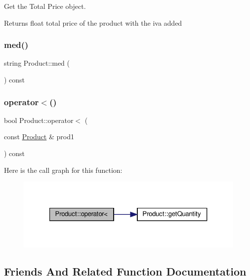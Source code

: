 Get the Total Price object. 

\begin{DoxyReturn}{Returns}
float total price of the product with the iva added 
\end{DoxyReturn}
\mbox{\label{classProduct_aa2ccc7b6aa44a0bf10694b18f910dfa1}} 
\subsubsection{\texorpdfstring{med()}{med()}}
{\footnotesize\ttfamily string Product\+::med (\begin{DoxyParamCaption}{ }\end{DoxyParamCaption}) const}

\mbox{\label{classProduct_add7a6d09de7f21ca5d8a0228461ad6ae}} 
\subsubsection{\texorpdfstring{operator$<$()}{operator<()}}
{\footnotesize\ttfamily bool Product\+::operator$<$ (\begin{DoxyParamCaption}\item[{const \hyperlink{classProduct}{Product} \&}]{prod1 }\end{DoxyParamCaption}) const}

Here is the call graph for this function\+:\nopagebreak
\begin{figure}[H]
\begin{center}
\leavevmode
\includegraphics[width=321pt]{classProduct_add7a6d09de7f21ca5d8a0228461ad6ae_cgraph}
\end{center}
\end{figure}


\subsection{Friends And Related Function Documentation}
\mbox{\label{classProduct_a8e60cf0623449094e3d8672262fe5420}} 
